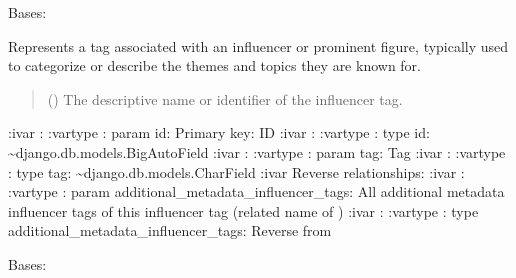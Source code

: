 \documentclass[letterpaper,10pt,english]{sphinxmanual}
\begin{document}

\begin{fulllineitems}
\label{\detokenize{source/meta_models_management:meta_models_management.models.InfluencerTag}}
\pysigstartsignatures
{}
\pysigstopsignatures
\sphinxAtStartPar
Bases: 

\sphinxAtStartPar
Represents a tag associated with an influencer or prominent figure, typically used to categorize or describe the themes and topics they are known for.
\begin{quote}\begin{description}
\sphinxAtStartPar
{} () \textendash{} The descriptive name or identifier of the influencer tag.

\end{description}\end{quote}

\sphinxAtStartPar
:ivar : 
:vartype : param id: Primary key: ID
:ivar : 
:vartype : type id: \textasciitilde{}django.db.models.BigAutoField
:ivar : 
:vartype : param tag: Tag
:ivar :
:vartype : type tag: \textasciitilde{}django.db.models.CharField
:ivar Reverse relationships:
:ivar : 
:vartype : param additional\_metadata\_influencer\_tags: All additional metadata influencer tags of this influencer tag (related name of )
:ivar : 
:vartype : type additional\_metadata\_influencer\_tags: Reverse  from {\hyperref[\detokenize{source/meta_models_management:meta_models_management.models.AdditionalMetadata}]{}}

\begin{fulllineitems}
\label{\detokenize{source/meta_models_management:meta_models_management.models.InfluencerTag.DoesNotExist}}
\pysigstartsignatures
{}
\pysigstopsignatures
\sphinxAtStartPar
Bases: 


\end{fulllineitems}
\end{fulllineitems}
\end{document}
